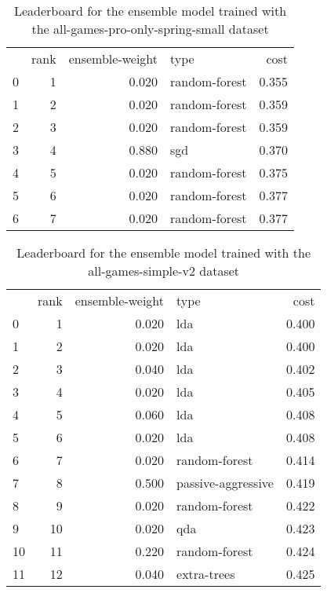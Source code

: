 \begin{table}[]
	\centering
	\begin{tabular}{lrrlr}
		  & rank & ensemble-weight & type          & cost  \\
		0 & 1    & 0.020           & random-forest & 0.355 \\
		1 & 2    & 0.020           & random-forest & 0.359 \\
		2 & 3    & 0.020           & random-forest & 0.359 \\
		3 & 4    & 0.880           & sgd           & 0.370 \\
		4 & 5    & 0.020           & random-forest & 0.375 \\
		5 & 6    & 0.020           & random-forest & 0.377 \\
		6 & 7    & 0.020           & random-forest & 0.377 \\
	\end{tabular}

	\caption{Leaderboard for the ensemble model trained with the all-games-pro-only-spring-small dataset}
	\label{tab:lb-all-games-pro-only-spring-small-randsplit}
\end{table}

\begin{table}[]
	\centering
	\begin{tabular}{lrrlr}
		   & rank & ensemble-weight & type               & cost  \\
		0  & 1    & 0.020           & lda                & 0.400 \\
		1  & 2    & 0.020           & lda                & 0.400 \\
		2  & 3    & 0.040           & lda                & 0.402 \\
		3  & 4    & 0.020           & lda                & 0.405 \\
		4  & 5    & 0.060           & lda                & 0.408 \\
		5  & 6    & 0.020           & lda                & 0.408 \\
		6  & 7    & 0.020           & random-forest      & 0.414 \\
		7  & 8    & 0.500           & passive-aggressive & 0.419 \\
		8  & 9    & 0.020           & random-forest      & 0.422 \\
		9  & 10   & 0.020           & qda                & 0.423 \\
		10 & 11   & 0.220           & random-forest      & 0.424 \\
		11 & 12   & 0.040           & extra-trees        & 0.425 \\
	\end{tabular}

	\caption{Leaderboard for the ensemble model trained with the all-games-simple-v2 dataset}
	\label{tab:lb-all-games-simple-v2}
\end{table}

